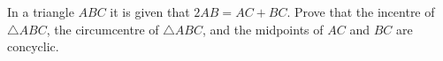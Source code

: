 In a triangle $ABC$ it is given that $2AB=AC+BC$. Prove that the incentre of $\triangle ABC$,  the circumcentre of $\triangle ABC$,  and the midpoints of $AC$ and $BC$ are concyclic.